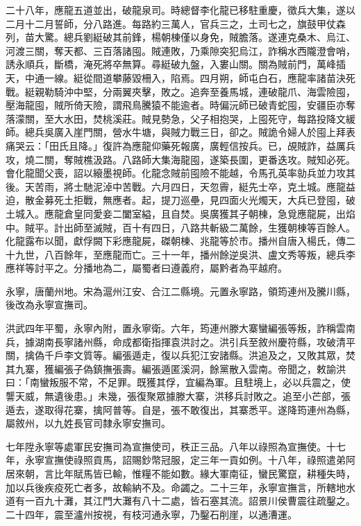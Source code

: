 \begin{pinyinscope}
二十八年，應龍五道並出，破龍泉司。時總督李化龍已移駐重慶，徵兵大集，遂以二月十二月誓師，分八路進。每路約三萬人，官兵三之，土司七之，旗鼓甲仗森列，苗大驚。總兵劉綎破其前鋒，楊朝棟僅以身免，賊膽落。遂連克桑木、烏江、河渡三關，奪天都、三百落諸囤。賊連敗，乃乘隙突犯烏江，詐稱水西隴澄會哨，誘永順兵，斷橋，淹死將卒無算。尋綎破九盤，入婁山關。關為賊前門，萬峰插天，中通一線。綎從間道攀藤毀柵入，陷焉。四月朔，師屯白石，應龍率諸苗決死戰。綎親勒騎沖中堅，分兩翼夾擊，敗之。追奔至養馬城，連破龍爪、海雲險囤，壓海龍囤，賊所倚天險，謂飛鳥騰猿不能逾者。時偏沅師已破青蛇囤，安疆臣亦奪落濛關，至大水田，焚桃溪莊。賊見勢急，父子相抱哭，上囤死守，每路投降文緩師。總兵吳廣入崖門關，營水牛塘，與賊力戰三日，卻之。賊詭令婦人於囤上拜表痛哭云：「田氏且降。」復許為應龍仰藥死報廣，廣輕信按兵。已，覘賊詐，益厲兵攻，燒二關，奪賊樵汲路。八路師大集海龍囤，遂築長圍，更番迭攻。賊知必死。會化龍聞父喪，詔以縗墨視師。化龍念賊前囤險不能越，令馬孔英率勍兵並力攻其後。天苦雨，將士馳泥淖中苦戰。六月四日，天忽霽，綎先士卒，克土城。應龍益迫，散金募死土拒戰，無應者。起，提刀巡壘，見四面火光燭天，大兵已登囤，破土城入。應龍倉皇同愛妾二闔室縊，且自焚。吳廣獲其子朝棟，急覓應龍屍，出焰中。賊平。計出師至滅賊，百十有四日，八路共斬級二萬餘，生獲朝棟等百餘人。化龍露布以聞，獻俘闕下彩應龍屍，磔朝棟、兆龍等於市。播州自唐入楊氏，傳二十九世，八百餘年，至應龍而亡。三十一年，播州餘逆吳洪、盧文秀等叛，總兵李應祥等討平之。分播地為二，屬蜀者曰遵義府，屬黔者為平越府。

永寧，唐蘭州地。宋為滬州江安、合江二縣境。元置永寧路，領筠連州及騰川縣，後改為永寧宣撫司。

洪武四年平蜀，永寧內附，置永寧衛。六年，筠連州滕大寨蠻編張等叛，詐稱雲南兵，據湖南長寧諸州縣，命成都衛指揮袁洪討之。洪引兵至敘州慶符縣，攻破清平關，擒偽千戶李文質等。編張遁走，復以兵犯江安諸縣。洪追及之，又敗其眾，焚其九寨，獲編張子偽鎮撫張壽。編張遁匿溪洞，餘黨散入雲南。帝聞之，敕諭洪曰：「南蠻叛服不常，不足罪。既獲其俘，宜編為軍。且駐境上，必以兵震之，使讋天威，無遺後患。」未幾，張復聚眾據滕大寨，洪移兵討敗之。追至小芒部，張遁去，遂取得花寨，擒阿普等。自是，張不敢復出，其寨悉平。遂降筠連州為縣，屬敘州，以九姓長官司隸永寧安撫司。

七年陞永寧等處軍民安撫司為宣撫使司，秩正三品。八年以祿照為宣撫使。十七年，永寧宣撫使祿照貢馬，詔賜鈔幣冠服，定三年一貢如例。十八年，祿照遣弟阿居來朝，言比年賦馬皆已輸，惟糧不能如數。緣大軍南征，蠻民驚竄，耕種失時，加以兵後疾疫死亡者多，故輸納不及。命蠲之。二十三年，永寧宣撫言，所轄地水道有一百九十灘，其江門大灘有八十二處，皆石塞其流。詔景川侯曹震往疏鑿之。二十四年，震至瀘州按視，有枝河通永寧，乃鑿石削崖，以通漕運。


\end{pinyinscope}
